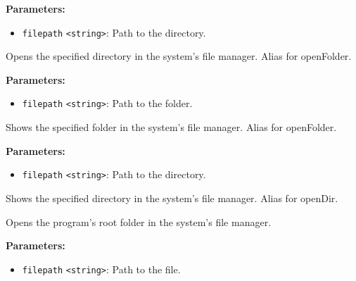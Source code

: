 \documentclass[12pt,a4paper]{article}
\begin{document}
\noindent \textbf{Parameters:}
\begin{itemize}
  \item \texttt{filepath} \texttt{<string>}: Path to the directory.
\end{itemize}

\noindent Opens the specified directory in the system's file manager. Alias for \textasciigrave{}openFolder\textasciigrave{}.

\vspace{5mm}
\noindent {}


\noindent \textbf{Parameters:}
\begin{itemize}
  \item \texttt{filepath} \texttt{<string>}: Path to the folder.
\end{itemize}

\noindent Shows the specified folder in the system's file manager. Alias for \textasciigrave{}openFolder\textasciigrave{}.

\vspace{5mm}
\noindent {}


\noindent \textbf{Parameters:}
\begin{itemize}
  \item \texttt{filepath} \texttt{<string>}: Path to the directory.
\end{itemize}

\noindent Shows the specified directory in the system's file manager. Alias for \textasciigrave{}openDir\textasciigrave{}.

\vspace{5mm}
\noindent {}


\noindent Opens the program's root folder in the system's file manager.

\vspace{5mm}
\noindent {}


\noindent \textbf{Parameters:}
\begin{itemize}
  \item \texttt{filepath} \texttt{<string>}: Path to the file.
\end{itemize}
\end{document}
